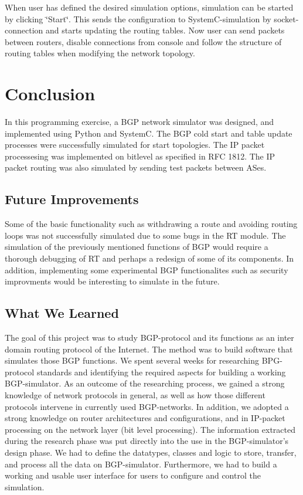 When user has defined the desired simulation options, simulation can be started by clicking \char`\"{}\-Start\char`\"{}. This sends the configuration to System\-C-\/simulation by socket-\/connection and starts updating the routing tables. Now user can send packets between routers, disable connections from console and follow the structure of routing tables when modifying the network topology. \hypertarget{index_s_conclusion}{}\section{Conclusion}\label{index_s_conclusion}
In this programming exercise, a B\-G\-P network simulator was designed, and implemented using Python and System\-C. The B\-G\-P cold start and table update processes were successfully simulated for start topologies. The I\-P packet processesing was implemented on bitlevel as specified in R\-F\-C 1812. The I\-P packet routing was also simulated by sending test packets between A\-Ses. \hypertarget{index_sub_futureImprovements}{}\subsection{Future Improvements}\label{index_sub_futureImprovements}
Some of the basic functionality such as withdrawing a route and avoiding routing loops was not successfully simulated due to some bugs in the R\-T module. The simulation of the previously mentioned functions of B\-G\-P would require a thorough debugging of R\-T and perhaps a redesign of some of its components. In addition, implementing some experimental B\-G\-P functionalites such as security improvments would be interesting to simulate in the future. \hypertarget{index_sub_whatwelearned}{}\subsection{What We Learned}\label{index_sub_whatwelearned}
The goal of this project was to study B\-G\-P-\/protocol and its functions as an inter domain routing protocol of the Internet. The method was to build software that simulates those B\-G\-P functions. We spent several weeks for researching B\-P\-G-\/protocol standards and identifying the required aspects for building a working B\-G\-P-\/simulator. As an outcome of the researching process, we gained a strong knowledge of network protocols in general, as well as how those different protocols intervene in currently used B\-G\-P-\/networks. In addition, we adopted a strong knowledge on router architectures and configurations, and in I\-P-\/packet processing on the network layer (bit level processing). The information extracted during the research phase was put directly into the use in the B\-G\-P-\/simulator's design phase. We had to define the datatypes, classes and logic to store, transfer, and process all the data on B\-G\-P-\/simulator. Furthermore, we had to build a working and usable user interface for users to configure and control the simulation.

